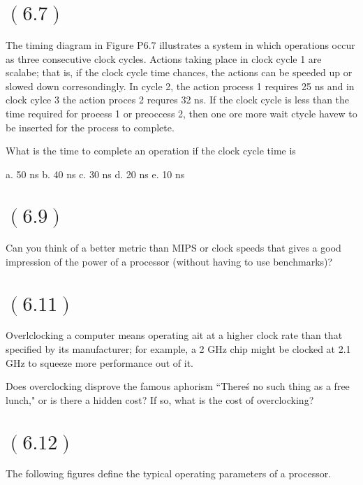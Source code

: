 \documentclass[letterpaper,12pt,titlepage]{article}
\begin{document}
\section*{$(6.7)$} The timing diagram in Figure P6.7 illustrates a system in which operations occur as three consecutive clock cycles. Actions taking place in clock cycle 1 are scalabe; that is, if the clock cycle time chances, the actions can be speeded up or slowed down corresondingly. In cycle 2, the action process 1 requires 25 ns and in clock cylce 3 the action proces 2 requres 32 ns. If the clock cycle is less than the time required for proeess 1 or preoccess 2, then one ore more wait ctycle havew to be inserted for the process to complete.

What is the time to complete an operation if the clock cycle time is

a. 50 ns
b. 40 ns
c. 30 ns
d. 20 ns
e. 10 ns

\begin{mdframed}[style=MyFrame]
\end{mdframed}

\section*{$(6.9)$} Can you think of a better metric than MIPS or clock speeds that gives a good impression of the power of a processor (without having to use benchmarks)?

\begin{mdframed}[style=MyFrame]
\end{mdframed}

\section*{$(6.11)$} Overlclocking a computer means operating ait at a higher clock rate than that specified by its manufacturer; for example, a 2 GHz chip might be clocked at 2.1 GHz to squeeze more performance out of it.

Does overclocking disprove the famous aphorism ``There\'s no such thing as a free lunch," or is there a hidden cost? If so, what is the cost of overclocking?

\begin{mdframed}[style=MyFrame]
\end{mdframed}

\section*{$(6.12)$} The following figures define the typical operating parameters of a processor.
\end{document}
